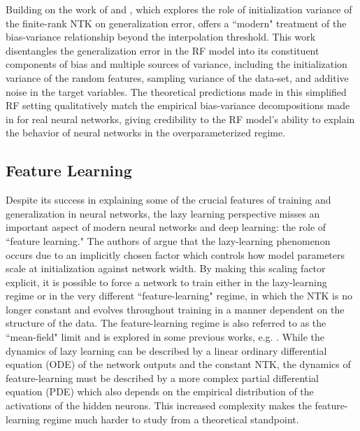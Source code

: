 \documentclass[a4paper, 12pt]{article}
\begin{document}
Building on the work of \cite{meiGeneralizationErrorRandom2019} and \cite{ geigerScalingDescriptionGeneralization2019}, which explores the role of initialization variance of the finite-rank NTK on generalization error, \cite{dascoliDoubleTroubleDouble2020} offers a ``modern" treatment of the bias-variance relationship beyond the interpolation threshold. This work disentangles the generalization error in the RF model into its constituent components of bias and multiple sources of variance, including the initialization variance of the random features, sampling variance of the data-set, and additive noise in the target variables. The theoretical predictions made in this simplified RF setting qualitatively match the empirical bias-variance decompositions made in \cite{nealModernTakeBiasVariance2019} for real neural networks, giving credibility to the RF model's ability to explain the behavior of neural networks in the overparameterized regime.

\subsection{Feature Learning}

Despite its success in explaining some of the crucial features of training and generalization in neural networks, the lazy learning perspective misses an important aspect of modern neural networks and deep learning: the role of ``feature learning."  The authors of \cite{chizatLazyTrainingDifferentiable2020} argue that the lazy-learning phenomenon occurs due to an implicitly chosen factor which controls how model parameters scale at initialization against network width. By making this scaling factor explicit, it is possible to force a network to train either in the lazy-learning regime or in the very different ``feature-learning" regime, in which the NTK is no longer constant and evolves throughout training in a manner dependent on the structure of the data. The feature-learning regime is also referred to as the ``mean-field" limit and is explored in some previous works, e.g. \cite{meiMeanFieldView2018}. While the dynamics of lazy learning can be described by a linear ordinary differential equation (ODE) of the network outputs and the constant NTK, the dynamics of feature-learning must be described by a more complex partial differential equation (PDE) which also depends on the empirical distribution of the activations of the hidden neurons. This increased complexity makes the feature-learning regime much harder to study from a theoretical standpoint.\\
\end{document}
